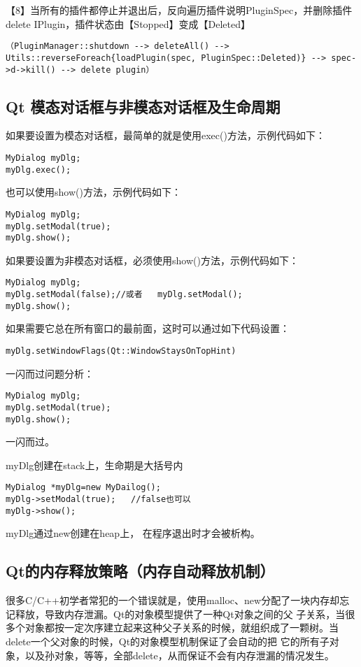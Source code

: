 【8】当所有的插件都停止并退出后，反向遍历插件说明PluginSpec，并删除插件delete IPlugin，插件状态由【Stopped】变成【Deleted】
\begin{lstlisting}
（PluginManager::shutdown --> deleteAll() --> Utils::reverseForeach{loadPlugin(spec, PluginSpec::Deleted)} --> spec->d->kill() --> delete plugin）    
\end{lstlisting}

\subsection{Qt 模态对话框与非模态对话框及生命周期}
如果要设置为模态对话框，最简单的就是使用exec()方法，示例代码如下：
\begin{lstlisting}
MyDialog myDlg;   
myDlg.exec();
\end{lstlisting}
        
也可以使用show()方法，示例代码如下：
\begin{lstlisting}
MyDialog myDlg;   
myDlg.setModal(true); 
myDlg.show();
\end{lstlisting}
        
如果要设置为非模态对话框，必须使用show()方法，示例代码如下：
\begin{lstlisting}
MyDialog myDlg; 
myDlg.setModal(false);//或者   myDlg.setModal();
myDlg.show();
\end{lstlisting}
        
如果需要它总在所有窗口的最前面，这时可以通过如下代码设置：
\begin{lstlisting}
myDlg.setWindowFlags(Qt::WindowStaysOnTopHint) 
\end{lstlisting}
        
一闪而过问题分析：
\begin{lstlisting}
MyDialog myDlg;   
myDlg.setModal(true); 
myDlg.show();   
\end{lstlisting}
一闪而过。

myDlg创建在stack上，生命期是大括号内
\begin{lstlisting}
MyDialog *myDlg=new MyDailog();   
myDlg->setModal(true);   //false也可以
myDlg->show();    
\end{lstlisting}
myDlg通过new创建在heap上， 在程序退出时才会被析构。
\subsection{Qt的内存释放策略（内存自动释放机制）}
很多C/C++初学者常犯的一个错误就是，使用malloc、new分配了一块内存却忘记释放，导致内存泄漏。Qt的对象模型提供了一种Qt对象之间的父 子关系，当很多个对象都按一定次序建立起来这种父子关系的时候，就组织成了一颗树。当delete一个父对象的时候，Qt的对象模型机制保证了会自动的把 它的所有子对象，以及孙对象，等等，全部delete，从而保证不会有内存泄漏的情况发生。


